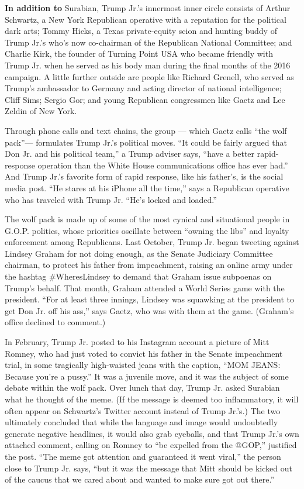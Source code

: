 \textbf{In addition to} Surabian, Trump Jr.'s innermost inner circle
consists of Arthur Schwartz, a New York Republican operative with a
reputation for the political dark arts; Tommy Hicks, a Texas
private-equity scion and hunting buddy of Trump Jr.'s who's now
co-chairman of the Republican National Committee; and Charlie Kirk, the
founder of Turning Point USA who became friendly with Trump Jr. when he
served as his body man during the final months of the 2016 campaign. A
little further outside are people like Richard Grenell, who served as
Trump's ambassador to Germany and acting director of national
intelligence; Cliff Sims; Sergio Gor; and young Republican congressmen
like Gaetz and Lee Zeldin of New York.

Through phone calls and text chains, the group --- which Gaetz calls
``the wolf pack''--- formulates Trump Jr.'s political moves. ``It could
be fairly argued that Don Jr. and his political team,'' a Trump adviser
says, ``have a better rapid-response operation than the White House
communications office has ever had.'' And Trump Jr.'s favorite form of
rapid response, like his father's, is the social media post. ``He stares
at his iPhone all the time,'' says a Republican operative who has
traveled with Trump Jr. ``He's locked and loaded.''

The wolf pack is made up of some of the most cynical and situational
people in G.O.P. politics, whose priorities oscillate between ``owning
the libs'' and loyalty enforcement among Republicans. Last October,
Trump Jr. began tweeting against Lindsey Graham for not doing enough, as
the Senate Judiciary Committee chairman, to protect his father from
impeachment, raising an online army under the hashtag \#WheresLindsey to
demand that Graham issue subpoenas on Trump's behalf. That month, Graham
attended a World Series game with the president. ``For at least three
innings, Lindsey was squawking at the president to get Don Jr. off his
ass,'' says Gaetz, who was with them at the game. (Graham's office
declined to comment.)

In February, Trump Jr. posted to his Instagram account a picture of Mitt
Romney, who had just voted to convict his father in the Senate
impeachment trial, in some tragically high-waisted jeans with the
caption, ``MOM JEANS: Because you're a pussy.'' It was a juvenile move,
and it was the subject of some debate within the wolf pack. Over lunch
that day, Trump Jr. asked Surabian what he thought of the meme. (If the
message is deemed too inflammatory, it will often appear on Schwartz's
Twitter account instead of Trump Jr.'s.) The two ultimately concluded
that while the language and image would undoubtedly generate negative
headlines, it would also grab eyeballs, and that Trump Jr.'s own
attached comment, calling on Romney to ``be expelled from the @GOP,''
justified the post. ``The meme got attention and guaranteed it went
viral,'' the person close to Trump Jr. says, ``but it was the message
that Mitt should be kicked out of the caucus that we cared about and
wanted to make sure got out there.''

